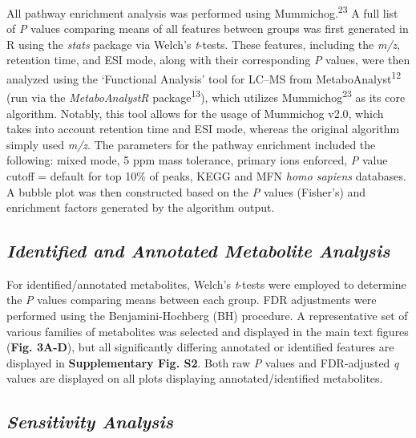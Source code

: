 \documentclass[
]{article}
\begin{document}
All pathway enrichment analysis was performed using
Mummichog.\textsuperscript{23} A full list of \textit{P} values
comparing means of all features between groups was first generated in R
using the \textit{stats} package via Welch's \textit{t}-tests. These
features, including the \textit{m/z}, retention time, and ESI mode,
along with their corresponding \textit{P} values, were then analyzed
using the `Functional Analysis' tool for LC--MS from
MetaboAnalyst\textsuperscript{12} (run via the \textit{MetaboAnalystR}
package\textsuperscript{13}), which utilizes
Mummichog\textsuperscript{23} as its core algorithm. Notably, this tool
allows for the usage of Mummichog v2.0, which takes into account
retention time and ESI mode, whereas the original algorithm simply used
\textit{m/z}. The parameters for the pathway enrichment included the
following: mixed mode, 5 ppm mass tolerance, primary ions enforced,
\textit{P} value cutoff = default for top 10\% of peaks, KEGG and MFN
\textit{homo sapiens} databases. A bubble plot was then constructed
based on the \textit{P} values (Fisher's) and enrichment factors
generated by the algorithm output.

\subsection{\texorpdfstring{\emph{Identified and Annotated Metabolite
Analysis}}{Identified and Annotated Metabolite Analysis}}\label{identified-and-annotated-metabolite-analysis}

For identified/annotated metabolites, Welch's \textit{t}-tests were
employed to determine the \textit{P} values comparing means between each
group. FDR adjustments were performed using the Benjamini-Hochberg (BH)
procedure. A representative set of various families of metabolites was
selected and displayed in the main text figures (\textbf{​Fig. 3​A-D}),
but all significantly differing annotated or identified features are
displayed in \textbf{Supplementary Fig. S2}. Both raw \textit{P} values
and FDR-adjusted \textit{q} values are displayed on all plots displaying
annotated/identified metabolites.

\subsection{\texorpdfstring{\emph{Sensitivity
Analysis}}{Sensitivity Analysis}}\label{sensitivity-analysis}
\end{document}
